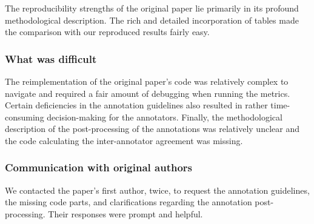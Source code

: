 The reproducibility strengths of the original paper lie primarily in its profound methodological description. The rich and detailed incorporation of tables made the comparison with our reproduced results fairly easy. 


\subsubsection*{What was difficult}

The reimplementation of the original paper's code was relatively complex to navigate and required a fair amount of debugging when running the metrics. Certain deficiencies in the annotation guidelines also resulted in rather time-consuming decision-making for the annotators. Finally, the methodological description of the post-processing of the annotations was relatively unclear and the code calculating the inter-annotator agreement was missing.




\subsubsection*{Communication with original authors}

We contacted the paper's first author, twice, to request the annotation guidelines, the missing code parts, and clarifications regarding the annotation post-processing. Their responses were prompt and helpful.